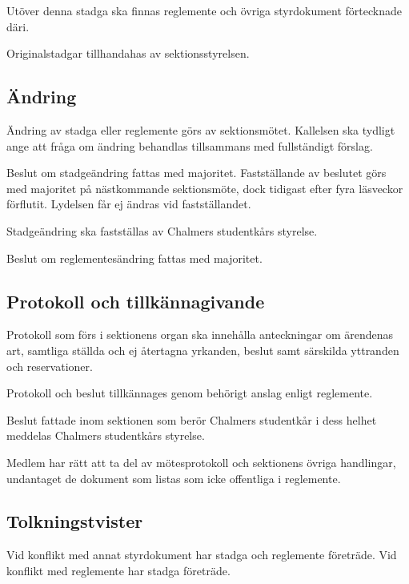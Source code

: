 \documentclass{styrdokument}
\begin{document}
\? Utöver denna stadga ska finnas reglemente och övriga styrdokument förtecknade däri.

\? Originalstadgar tillhandahas av sektionsstyrelsen.

\subsection{Ändring}

\? Ändring av stadga eller reglemente görs av sektionsmötet.
Kallelsen ska tydligt ange att fråga om ändring behandlas tillsammans med fullständigt förslag.
\label{beslut.andring.kallelse}

\? Beslut om stadgeändring fattas med  majoritet.
Fastställande av beslutet görs med  majoritet på nästkommande sektionsmöte, dock tidigast efter fyra läsveckor förflutit.
Lydelsen får ej ändras vid fastställandet.
\label{beslut.stadgeandring}

\? Stadgeändring ska fastställas av Chalmers studentkårs styrelse.

\? Beslut om reglementesändring fattas med  majoritet.
\label{beslut.reglementesandring}

\subsection{Protokoll och tillkännagivande} \label{protokoll}

\? Protokoll som förs i sektionens organ ska innehålla anteckningar om ärendenas art, samtliga ställda och ej återtagna yrkanden, beslut samt särskilda yttranden och reservationer.

\? Protokoll och beslut tillkännages genom behörigt anslag enligt reglemente.

\? Beslut fattade inom sektionen som berör Chalmers studentkår i dess helhet meddelas Chalmers studentkårs styrelse.

\? Medlem har rätt att ta del av mötesprotokoll och sektionens övriga handlingar, undantaget de dokument som listas som icke offentliga i reglemente.
\label{ratt.offentlighet}

\subsection{Tolkningstvister}

\? Vid konflikt med annat styrdokument har stadga och reglemente företräde.
Vid konflikt med reglemente har stadga företräde.
\end{document}
